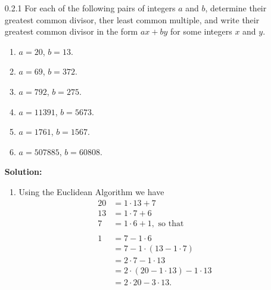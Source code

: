 \begin{enumerate}
   \item[0.2.1]   For each of the following pairs of integers $a$ and $b$,
                  determine their greatest common divisor, ther least common
                  multiple, and write their greatest common divisor in the form
                  $ax + by$ for some integers $x$ and $y$.
                  \begin{enumerate}
                     \item $a = 20$, $b = 13$.
                     \item $a = 69$, $b = 372$.
                     \item $a = 792$, $b = 275$.
                     \item $a = 11391$, $b = 5673$.
                     \item $a = 1761$, $b = 1567$.
                     \item $a = 507885$, $b = 60808$.
                  \end{enumerate}

      \textbf{Solution:}

      \begin{enumerate}
         \item Using the Euclidean Algorithm we have
               \begin{align*}
                  20 &= 1 \cdot 13 + 7 \\
                  13 &= 1 \cdot 7 + 6 \\
                  7  &= 1 \cdot 6 + 1, \text{ so that } \\ \\
                  1  &= 7 - 1 \cdot 6 \\
                     &= 7 - 1 \cdot (13 - 1 \cdot 7) \\
                     &= 2 \cdot 7 - 1 \cdot 13 \\
                     &= 2 \cdot (20 - 1 \cdot 13) - 1 \cdot 13 \\
                     &= 2 \cdot 20 - 3 \cdot 13.
               \end{align*}


\end{enumerate}
\end{enumerate}
